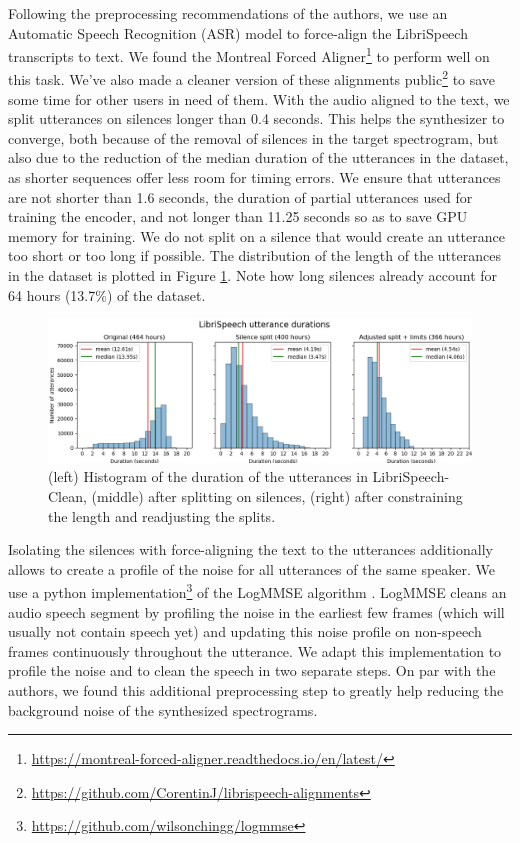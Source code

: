 \documentclass[a4paper, oneside, 12pt, english]{article}
\begin{document}
Following the preprocessing recommendations of the authors, we use an Automatic Speech Recognition (ASR) model to force-align the LibriSpeech transcripts to text. We found the Montreal Forced Aligner\footnote{\url{https://montreal-forced-aligner.readthedocs.io/en/latest/}} to perform well on this task. We've also made a cleaner version of these alignments public\footnote{\url{https://github.com/CorentinJ/librispeech-alignments}} to save some time for other users in need of them. With the audio aligned to the text, we split utterances on silences longer than 0.4 seconds. This helps the synthesizer to converge, both because of the removal of silences in the target spectrogram, but also due to the reduction of the median duration of the utterances in the dataset, as shorter sequences offer less room for timing errors. We ensure that utterances are not shorter than 1.6 seconds, the duration of partial utterances used for training the encoder, and not longer than 11.25 seconds so as to save GPU memory for training. We do not split on a silence that would create an utterance too short or too long if possible. The distribution of the length of the utterances in the dataset is plotted in Figure \ref{librispeech_durations}. Note how long silences already account for 64 hours (13.7\%) of the dataset.

\begin{figure}[h]
	\centering
	\includegraphics[width=\linewidth]{images/librispeech_durations.png}
	\caption{(left) Histogram of the duration of the utterances in LibriSpeech-Clean, (middle) after splitting on silences, (right) after constraining the length and readjusting the splits.}
	\label{librispeech_durations}
\end{figure}

Isolating the silences with force-aligning the text to the utterances additionally allows to create a profile of the noise for all utterances of the same speaker. We use a python implementation\footnote{\url{https://github.com/wilsonchingg/logmmse}} of the LogMMSE algorithm \citep{LogMMSE}. LogMMSE cleans an audio speech segment by profiling the noise in the earliest few frames (which will usually not contain speech yet) and updating this noise profile on non-speech frames continuously throughout the utterance. We adapt this implementation to profile the noise and to clean the speech in two separate steps. On par with the authors, we found this additional preprocessing step to greatly help reducing the background noise of the synthesized spectrograms.
\end{document}
